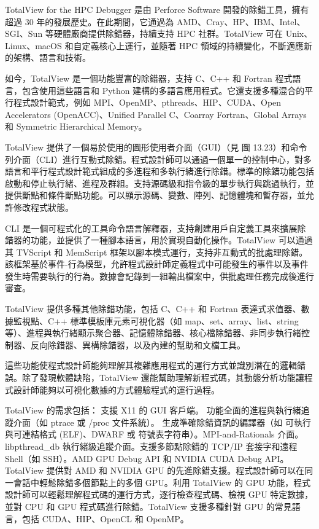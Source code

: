 TotalView for the HPC Debugger 是由 Perforce Software 開發的除錯工具，擁有超過 30 年的發展歷史。在此期間，它通過為 AMD、Cray、HP、IBM、Intel、SGI、Sun 等硬體廠商提供除錯器，持續支持 HPC 社群。TotalView 可在 Unix、Linux、macOS 和自定義核心上運行，並隨著 HPC 領域的持續變化，不斷適應新的架構、語言和技術。

如今，TotalView 是一個功能豐富的除錯器，支持 C、C++ 和 Fortran 程式語言，包含使用這些語言和 Python 建構的多語言應用程式。它還支援多種混合的平行程式設計範式，例如 MPI、OpenMP、pthreads、HIP、CUDA、Open Accelerators (OpenACC)、Unified Parallel C、Coarray Fortran、Global Arrays 和 Symmetric Hierarchical Memory。

TotalView 提供了一個易於使用的圖形使用者介面（GUI）（見 圖 13.23）和命令列介面（CLI）進行互動式除錯。程式設計師可以通過一個單一的控制中心，對多語言和平行程式設計範式組成的多進程和多執行緒進行除錯。標準的除錯功能包括啟動和停止執行緒、進程及群組。支持源碼級和指令級的單步執行與跳過執行，並提供斷點和條件斷點功能。可以顯示源碼、變數、陣列、記憶體塊和暫存器，並允許修改程式狀態。

CLI 是一個可程式化的工具命令語言解釋器，支持創建用戶自定義工具來擴展除錯器的功能，並提供了一種腳本語言，用於實現自動化操作。TotalView 可以通過其 TVScript 和 MemScript 框架以腳本模式運行，支持非互動式的批處理除錯。該框架基於事件-行為模型，允許程式設計師定義程式中可能發生的事件以及事件發生時需要執行的行為。數據會記錄到一組輸出檔案中，供批處理任務完成後進行審查。


TotalView 提供多種其他除錯功能，包括 C、C++ 和 Fortran 表達式求值器、數據監視點、C++ 標準模板庫元素可視化器（如 map、set、array、list、string 等）、進程與執行緒顯示聚合器、記憶體除錯器、核心檔除錯器、非同步執行緒控制器、反向除錯器、異構除錯器，以及內建的幫助和文檔工具。

這些功能使程式設計師能夠理解其複雜應用程式的運行方式並識別潛在的邏輯錯誤。除了發現軟體缺陷，TotalView 還能幫助理解新程式碼，其動態分析功能讓程式設計師能夠以可視化數據的方式體驗程式的運行過程。

TotalView 的需求包括：
支援 X11 的 GUI 客戶端。
功能全面的進程與執行緒追蹤介面（如 ptrace 或 /proc 文件系統）。
生成準確除錯資訊的編譯器（如 可執行與可連結格式 (ELF)、DWARF 或 符號表字符串）。MPI-and-Rationals 介面。libpthread\_db 執行緒級追蹤介面。支援多節點除錯的 TCP/IP 套接字和遠程 Shell（如 SSH）。AMD GPU Debug API 和 NVIDIA CUDA Debug API。
TotalView 提供對 AMD 和 NVIDIA GPU 的先進除錯支援。程式設計師可以在同一會話中輕鬆除錯多個節點上的多個 GPU。利用 TotalView 的 GPU 功能，程式設計師可以輕鬆理解程式碼的運行方式，逐行檢查程式碼、檢視 GPU 特定數據，並對 CPU 和 GPU 程式碼進行除錯。TotalView 支援多種針對 GPU 的常見語言，包括 CUDA、HIP、OpenCL 和 OpenMP。

